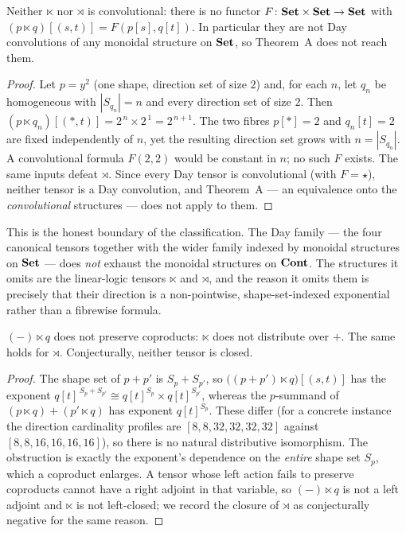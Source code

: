 \begin{Proposition}
\label{prop:nonconv}
Neither $\ltimes$ nor $\rtimes$ is convolutional: there is no functor
$F\colon\mathbf{Set}\times\mathbf{Set}\to\mathbf{Set}$ with $(p\ltimes q)[(s,t)]=F(p[s],q[t])$. In
particular they are not Day convolutions of any monoidal structure on $\mathbf{Set}$, so
Theorem~A does not reach them.
\end{Proposition}

\begin{proof}
Let $p=y^{2}$ (one shape, direction set of size $2$) and, for each $n$, let
$q_n$ be homogeneous with $|S_{q_n}|=n$ and every direction set of size $2$.
Then $(p\ltimes q_n)[(\ast,t)]=2^{\,n}\times 2^{\,1}=2^{\,n+1}$. The two fibres
$p[\ast]=2$ and $q_n[t]=2$ are fixed independently of $n$, yet the resulting
direction set grows with $n=|S_{q_n}|$. A convolutional formula $F(2,2)$ would be
constant in $n$; no such $F$ exists. The same inputs defeat $\rtimes$. Since
every Day tensor is convolutional (with $F=\star$), neither tensor is a Day
convolution, and Theorem~A --- an equivalence onto the \emph{convolutional}
structures --- does not apply to them.
\end{proof}

This is the honest boundary of the classification. The Day family --- the four
canonical tensors together with the wider family indexed by monoidal structures
on $\mathbf{Set}$ --- does \emph{not} exhaust the monoidal structures on $\mathbf{Cont}$. The
structures it omits are the linear-logic tensors $\ltimes$ and $\rtimes$, and
the reason it omits them is precisely that their direction is a non-pointwise,
shape-set-indexed exponential rather than a fibrewise formula.

\begin{Proposition}
\label{prop:noncocont}
$(-)\ltimes q$ does not preserve coproducts: $\ltimes$ does not distribute over
$+$. The same holds for $\rtimes$. Conjecturally, neither tensor is closed.
\end{Proposition}

\begin{proof}
The shape set of $p+p'$ is $S_p+S_{p'}$, so
$\bigl((p+p')\ltimes q\bigr)[(s,t)]$ has the exponent
$q[t]^{\,S_p+S_{p'}}\cong q[t]^{S_p}\times q[t]^{S_{p'}}$, whereas the
$p$-summand of $(p\ltimes q)+(p'\ltimes q)$ has exponent $q[t]^{S_p}$. These
differ (for a concrete instance the direction cardinality profiles are
$[8,8,32,32,32,32]$ against $[8,8,16,16,16,16]$), so there is no natural
distributive isomorphism. The obstruction is exactly the exponent's dependence
on the \emph{entire} shape set $S_p$, which a coproduct enlarges. A tensor whose
left action fails to preserve coproducts cannot have a right adjoint in that
variable, so $(-)\ltimes q$ is not a left adjoint and $\ltimes$ is not
left-closed; we record the closure of $\rtimes$ as conjecturally negative for
the same reason.
\end{proof}

